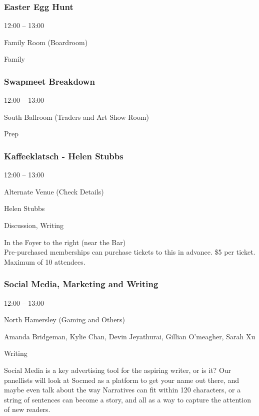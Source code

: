 \documentclass{scrreprt}
\begin{document}
\begin{multicols}{2}
\subsubsection*{Easter Egg Hunt}\begin{description}
\setlength{\itemsep}{0pt}
\setlength{\parsep}{0pt}
\setlength{\parskip}{0pt}
\item[Time:]{12:00 -- 13:00}
\item[Venue:]{Family Room (Boardroom)}
\item[Tags:]{Family}\end{description}

\subsubsection*{Swapmeet Breakdown}\begin{description}
\setlength{\itemsep}{0pt}
\setlength{\parsep}{0pt}
\setlength{\parskip}{0pt}
\item[Time:]{12:00 -- 13:00}
\item[Venue:]{South Ballroom (Traders and Art Show Room)}
\item[Tags:]{Prep}\end{description}

\subsubsection*{Kaffeeklatsch - Helen Stubbs}\begin{description}
\setlength{\itemsep}{0pt}
\setlength{\parsep}{0pt}
\setlength{\parskip}{0pt}
\item[Time:]{12:00 -- 13:00}
\item[Venue:]{Alternate Venue (Check Details)}
\item[People:]{Helen Stubbs}
\item[Tags:]{Discussion, Writing}\end{description}
In the Foyer to the right (near the Bar) \\Pre-purchased memberships can purchase tickets to this in advance. \$5 per ticket. Maximum of 10 attendees.
\subsubsection*{Social Media, Marketing and Writing}\begin{description}
\setlength{\itemsep}{0pt}
\setlength{\parsep}{0pt}
\setlength{\parskip}{0pt}
\item[Time:]{12:00 -- 13:00}
\item[Venue:]{North Hamersley (Gaming and Others)}
\item[People:]{Amanda Bridgeman, Kylie Chan, Devin Jeyathurai, Gillian O'meagher, Sarah Xu}
\item[Tags:]{Writing}\end{description}
Social Media is a key advertising tool for the aspiring writer, or is it? Our panellists will look at Socmed as a platform to get your name out there, and maybe even talk about the way Narratives can fit within 120 characters, or a string of sentences can become a story, and all as a way to capture the attention of new readers.

\end{multicols}
\end{document}
